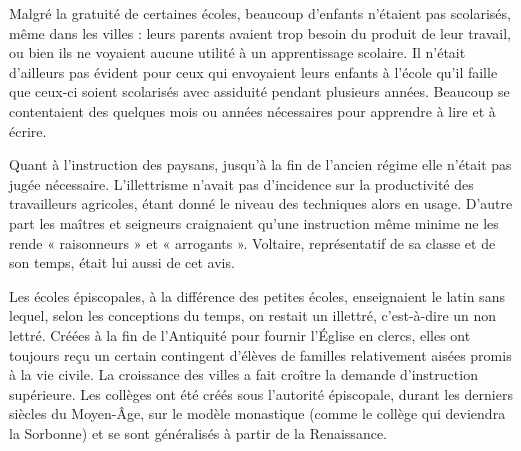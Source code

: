  Malgré la gratuité de certaines écoles, beaucoup d'enfants n'étaient pas scolarisés, même dans les villes : leurs parents avaient trop besoin du produit de leur travail, ou bien ils ne voyaient aucune utilité à un apprentissage scolaire. Il n'était d'ailleurs pas évident pour ceux qui envoyaient leurs enfants à l'école qu'il faille que ceux-ci soient scolarisés avec assiduité pendant plusieurs années. Beaucoup se contentaient des quelques mois ou années nécessaires pour apprendre à lire et à écrire.

 Quant à l'instruction des paysans, jusqu'à la fin de l'ancien régime elle n'était pas jugée nécessaire. L'illettrisme n'avait pas d'incidence sur la productivité des travailleurs agricoles, étant donné le niveau des techniques alors en usage. D'autre part les maîtres et seigneurs craignaient qu'une instruction même minime ne les rende « raisonneurs » et « arrogants ». Voltaire, représentatif de sa classe et de son temps, était lui aussi de cet avis.

 Les écoles épiscopales, à la différence des petites écoles, enseignaient le latin sans lequel, selon les conceptions du temps, on restait un illettré, c'est-à-dire un non lettré. Créées à la fin de l'Antiquité pour fournir l'Église en clercs, elles ont toujours reçu un certain contingent d'élèves de familles relativement aisées promis à la vie civile. La croissance des villes a fait croître la demande d'instruction supérieure. Les collèges ont été créés sous l'autorité épiscopale, durant les derniers siècles du Moyen-Âge, sur le modèle monastique (comme le collège qui deviendra la Sorbonne) et se sont généralisés à partir de la Renaissance.

